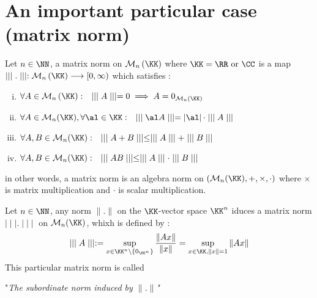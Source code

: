 \section{An important particular case (matrix norm)}
\begin{definition}[]
Let $n \in \NN$, a matrix norm on $\mathcal{M} _{n} \left( \KK \right)$ 
where $\KK = \RR  \text{ or } \CC $ is a map 
$ \mid \mid \mid  . \mid \mid \mid  : \mathcal{M} _{n}\left( \KK \right) \longrightarrow [0,\infty ) $ 
which satisfies : 
\begin{enumerate}[(i)]
\item $\forall  A \in  \mathcal{M}_{n}\left( \KK \right)  : 
	\quad \mid \mid \mid  A \mid \mid \mid  = 0 
	\implies A = 0_{\mathcal{M} _{n}(\KK) }$ 
\item $\forall  A \in \mathcal{M} _{n}(\KK), 
	\forall \al \in \KK : \quad 
	\mid \mid \mid  \al A \mid \mid \mid = 
	\left| \al \right| \cdot 
	\mid \mid \mid  A \mid \mid \mid $  
\item $\forall A,B \in \mathcal{M} _{n}(\KK) : \quad 
	\mid \mid \mid  A+B \mid \mid \mid 
	\leq  \mid \mid \mid  A \mid \mid \mid + 
	\mid \mid \mid  B \mid \mid \mid $  
\item $\forall  A,B \in \mathcal{M} _{n}(\KK) : 
	\quad \mid \mid \mid  AB \mid \mid \mid \leq 
	\mid \mid \mid  A \mid \mid \mid 
	\cdot \mid \mid \mid  B \mid \mid \mid $  
\end{enumerate}
in other words, a matrix norm is an algebra norm on 
$\left( \mathcal{M} _{n}(\KK) , +, \times , \cdot   \right)$ where
$\times  $  is matrix multiplication and $\cdot $ is scalar multiplication.
\end{definition}
\begin{remark}[]
Let $n \in \NN$, any norm $\| . \| $  on the $\KK$-vector space
$\KK^{n}$ iduces a matrix norm $\mid \mid \mid  . \mid \mid \mid $  on
$\mathcal{M} _{n}(\KK) $, whixh is defined by : 
\[
\mid \mid \mid  A \mid \mid \mid :=
\sup_{x \in \KK^{n} \backslash \left\{ 0_{\KK^{n}}\right\}}  
\frac{\| Ax \| }{\| x \| } = 
\sup_{x \in \KK, \| x \| =1} 
\| Ax \| 
\]
This particular matrix norm is called 
\begin{center}
	"\it The subordinate norm induced by $\| . \| $"  
	\normalfont
\end{center}
\end{remark}
